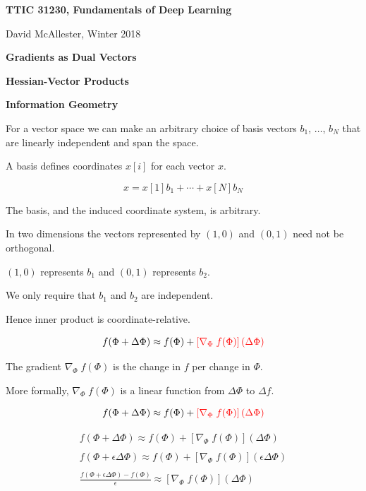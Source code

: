 



{\Huge
  \centerline{\bf TTIC 31230, Fundamentals of Deep Learning}
  \bigskip
  \centerline{David McAllester, Winter 2018}
  \vfill
  \centerline{\bf Gradients as Dual Vectors }
  \vfill
  \centerline{\bf Hessian-Vector Products}
  \vfill
  \centerline{\bf Information Geometry}


For a vector space we can make an arbitrary choice of basis vectors $b_1$, $\ldots$, $b_N$
that are linearly independent and span the space.

\vfill
A basis defines coordinates $x[i]$ for each vector $x$.

$$x = x[1]b_1 + \cdots + x[N] b_N$$

\vfill
The basis, and the induced coordinate system, is arbitrary.


\vfill
In two dimensions the vectors represented by $(1,0)$ and $(0,1)$ need not be orthogonal.

\vfill
$(1,0)$ represents $b_1$ and $(0,1)$ represents $b_2$.

\vfill
We only require that $b_1$ and $b_2$ are independent.

\vfill
Hence inner product is coordinate-relative.



$$f(\Phi + \Delta\Phi) \approx f(\Phi) + {\color{red} \left[\nabla_\Phi \;f(\Phi)\right](\Delta \Phi)}$$


The gradient $\nabla_\Phi \; f(\Phi)$ is the change in $f$ per change in $\Phi$.

\vfill
More formally, $\nabla_\Phi\; f(\Phi)$ is a linear function from $\Delta \Phi$ to $\Delta f$.

\vfill
$$f(\Phi + \Delta\Phi) \approx f(\Phi) + {\color{red} \left[\nabla_\Phi \;f(\Phi)\right](\Delta \Phi)}$$


\begin{eqnarray*}
f(\Phi + \Delta\Phi) \approx f(\Phi) + \left[\nabla_\Phi \;f(\Phi)\right](\Delta \Phi) \\
\\
f(\Phi + \epsilon \Delta\Phi) \approx f(\Phi) + \left[\nabla_\Phi \;f(\Phi)\right](\epsilon \Delta \Phi) \\
\\
\frac{f(\Phi + \epsilon \Delta\Phi) - f(\Phi)}{\epsilon} \approx \left[\nabla_\Phi \;f(\Phi)\right](\Delta \Phi)
\end{eqnarray*}

}

